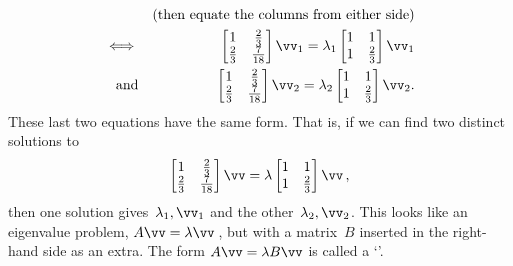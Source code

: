 \begin{example}
\begin{solution}
\begin{enumerate}
\begin{eqnarray*}
\\&&(\text{then equate the columns from either side})
\\\iff&&\begin{bmatrix} 1&\tfrac23\\\tfrac23&\frac7{18} \end{bmatrix}\vv_1=\lambda_1\begin{bmatrix} 1&1\\1&\tfrac23 \end{bmatrix}\vv_1
\\\text{and}&&\begin{bmatrix} 1&\tfrac23\\\tfrac23&\frac7{18} \end{bmatrix}\vv_2=\lambda_2\begin{bmatrix} 1&1\\1&\tfrac23 \end{bmatrix}\vv_2.
\end{eqnarray*}
These last two equations have the same form.
That is, if we can find two distinct solutions to
\begin{equation*}
\begin{bmatrix} 1&\tfrac23\\\tfrac23&\frac7{18} \end{bmatrix}\vv=\lambda\begin{bmatrix} 1&1\\1&\tfrac23 \end{bmatrix}\vv\,,
\end{equation*}
then one solution gives~\(\lambda_1,\vv_1\) and the other~\(\lambda_2,\vv_2\).
This looks like an eigenvalue problem, \(A\vv=\lambda\vv\)\,, but with a matrix~\(B\) inserted in the right-hand side as an extra.
The form \(A\vv=\lambda B\vv\) is called a `'.


\end{enumerate}
\end{solution}
\end{example}
